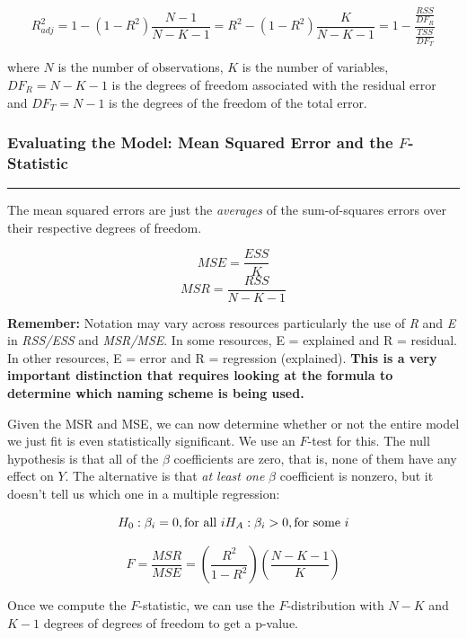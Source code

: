 \documentclass[11pt]{article}
\begin{document}
\[R_{adj}^2 = 1 - \left( 1 - R^2 \right) \frac{N - 1}{N - K - 1} = R^2 - \left( 1 - R^2 \right) \frac{K}{N - K - 1} = 1 - \frac{\frac{RSS}{DF_R}}{\frac{TSS}{DF_T}}\]

where \(N\) is the number of observations, \(K\) is the number of
variables, \(DF_R = N - K - 1\) is the degrees of freedom associated
with the residual error and \(DF_T = N - 1\) is the degrees of the
freedom of the total error.

    \subsubsection{\texorpdfstring{Evaluating the Model: Mean Squared Error
and the
\(F\)-Statistic}{Evaluating the Model: Mean Squared Error and the F-Statistic}}\label{evaluating-the-model-mean-squared-error-and-the-f-statistic}

\begin{center}\rule{0.5\linewidth}{\linethickness}\end{center}

The mean squared errors are just the \emph{averages} of the
sum-of-squares errors over their respective degrees of freedom.

\[MSE = \frac{ESS}{K}\] \[MSR = \frac{RSS}{N-K-1}\]

\textbf{Remember: } Notation may vary across resources particularly the
use of \emph{R} and \emph{E} in \emph{RSS/ESS} and \emph{MSR/MSE}. In
some resources, E = explained and R = residual. In other resources, E =
error and R = regression (explained). \textbf{This is a very important
distinction that requires looking at the formula to determine which
naming scheme is being used.}

Given the MSR and MSE, we can now determine whether or not the entire
model we just fit is even statistically significant. We use an
\(F\)-test for this. The null hypothesis is that all of the \(\beta\)
coefficients are zero, that is, none of them have any effect on \(Y\).
The alternative is that \emph{at least one} \(\beta\) coefficient is
nonzero, but it doesn't tell us which one in a multiple regression:

\[H_0: \beta_i = 0, \mbox{for all $i$} \\
H_A: \beta_i > 0, \mbox{for some $i$}\]

\[F = \frac{MSR}{MSE} = \left( \frac{R^2}{1 - R^2} \right) \left( \frac{N - K - 1}{K} \right)\]

Once we compute the \(F\)-statistic, we can use the \(F\)-distribution
with \(N-K\) and \(K-1\) degrees of degrees of freedom to get a p-value.
\end{document}
